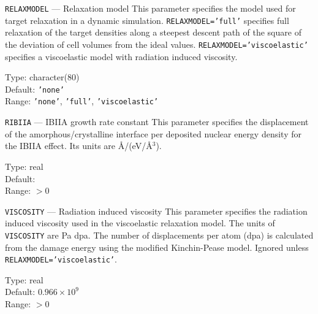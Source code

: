 \begin{keydescription}{\texttt{RELAXMODEL} --- Relaxation model}
%
  This parameter specifies the model used for target relaxation in a
  dynamic simulation. \texttt{RELAXMODEL='full'} specifies full relaxation
  of the target densities along a steepest descent path of the square of the 
  deviation of cell volumes from the ideal values. 
  \texttt{RELAXMODEL='viscoelastic'} specifies a viscoelastic model with
  radiation induced viscosity.
  \begin{keytab}
    Type:    \> character(80) \\
    Default: \> \texttt{'none'} \\
    Range:   \> \texttt{'none'}, \texttt{'full'}, \texttt{'viscoelastic'}
  \end{keytab}
\end{keydescription}

\begin{keydescription}{\texttt{RIBIIA} --- IBIIA growth rate constant}
%
  This parameter specifies the displacement of the
  amorphous/crystalline interface per deposited nuclear energy
  density for the IBIIA effect. Its units are \AA /(eV/\AA $^3$).
  \begin{keytab}
    Type:    \> real \\
    Default:  \\
    Range:   \> $> 0$ 
  \end{keytab}
\end{keydescription}

\begin{keydescription}{\texttt{VISCOSITY} --- Radiation induced viscosity}
%
  This parameter specifies the radiation induced viscosity used in the 
  viscoelastic relaxation model. The units of \texttt{VISCOSITY} are Pa dpa.
  The number of displacements per atom (dpa) is calculated from the damage 
  energy using the modified Kinchin-Pease model. Ignored unless 
  \texttt{RELAXMODEL='viscoelastic'}.
  \begin{keytab}
    Type:    \> real \\
    Default: \> $0.966 \times 10^9$ \\
    Range:   \> $>0$
  \end{keytab}
\end{keydescription}

